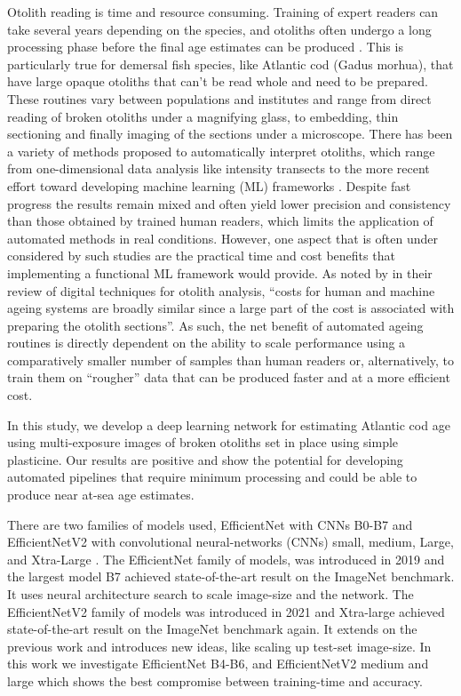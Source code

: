 \documentclass[10pt,letterpaper]{article}
\begin{document}
Otolith reading is time and resource consuming. Training of expert readers can take several years depending on the species, and otoliths often undergo a long processing phase before the final age estimates can be produced \citep{Carbonara}. This is particularly true for demersal fish species, like Atlantic cod (Gadus morhua), that have large opaque otoliths that can’t be read whole and need to be prepared. These routines vary between populations and institutes and range from direct reading of broken otoliths under a magnifying glass, to embedding, thin sectioning and finally imaging of the sections under a microscope. There has been a variety of methods proposed to automatically interpret otoliths, which range from one-dimensional data analysis like intensity transects \citep{Mahe} to the more recent effort toward developing machine learning (ML) frameworks \citep{moenetal, Politikos}. Despite fast progress the results remain mixed and often yield lower precision and consistency than those obtained by trained human readers, which limits the application of automated methods in real conditions.
However, one aspect that is often under considered by such studies are the practical time and cost benefits that implementing a functional ML framework would provide. As noted by \citep{Fisher} in their review of digital techniques for otolith analysis, “costs for human and machine ageing systems are broadly similar since a large part of the cost is associated with preparing the otolith sections”. As such, the net benefit of automated ageing routines is directly dependent on the ability to scale performance using a comparatively smaller number of samples than human readers or, alternatively, to train them on “rougher” data that can be produced faster and at a more efficient cost.

In this study, we develop a deep learning network for estimating Atlantic cod age using multi-exposure images of broken otoliths set in place using simple plasticine. Our results are positive and show the potential for developing automated pipelines that require minimum processing and could be able to produce near at-sea age estimates.

There are two families of models used, EfficientNet with CNNs B0-B7 \citep{DBLP:journals/corr/abs-1905-11946}  and EfficientNetV2 with 
convolutional neural-networks (CNNs)
small, medium, Large, and Xtra-Large \citep{DBLP:journals/corr/abs-1905-11946}. The EfficientNet family of models, was introduced in 2019 and the largest model B7 achieved state-of-the-art result on the ImageNet \citep{deng2009imagenet} benchmark. It uses neural architecture search to scale image-size and the network. The EfficientNetV2 family of models was introduced in 2021 and Xtra-large achieved state-of-the-art result on the ImageNet benchmark again. It extends on the previous work and introduces new ideas, like scaling up test-set image-size.
In this work we investigate EfficientNet B4-B6, and EfficientNetV2 medium and large which shows the best compromise between training-time
and accuracy.
\end{document}
